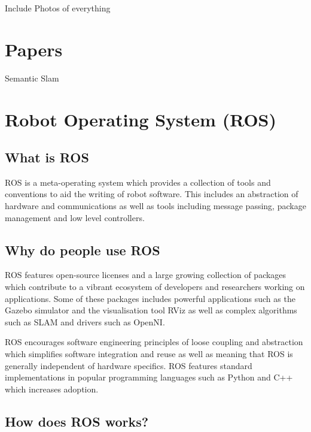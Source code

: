 \documentclass{mproj}
\begin{document}
Include Photos of everything
\section{Papers}
Semantic Slam
\section{Robot Operating System (ROS)}
\subsection{What is ROS}

ROS is a meta-operating system which provides a collection of tools and conventions to aid the writing of robot software. This includes an abstraction of hardware and communications as well as tools including message passing, package management and low level controllers.

\subsection{Why do people use ROS}

ROS features open-source licenses and a large growing collection of packages which contribute to a vibrant ecosystem of developers and researchers working on applications. Some of these packages includes powerful applications such as the Gazebo simulator and the visualisation tool RViz as well as complex algorithms such as SLAM and drivers such as OpenNI.

ROS encourages software engineering principles of loose coupling and abstraction which simplifies software integration and reuse as well as meaning that ROS is generally independent of hardware specifics. ROS features standard implementations in popular programming languages such as Python and C++ which increases adoption.

\subsection{How does ROS works?}
\end{document}
